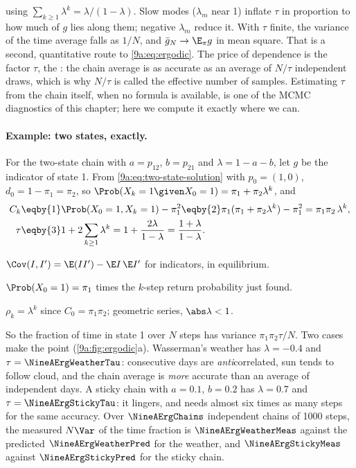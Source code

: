 using $\sum_{k\ge1}\lambda^k=\lambda/(1-\lambda)$. Slow modes ($\lambda_m$ near 1) inflate $\tau$
in proportion to how much of $g$ lies along them; negative $\lambda_m$ reduce it. With $\tau$
finite, the variance of the time average falls as $1/N$, and $\bar g_N\to\E_\pi g$ in mean square. That is a second,
quantitative route to \eqref{9a:eq:ergodic}. The price of dependence is the factor $\tau$, the
: the chain average is as accurate as an average of
$N/\tau$ independent draws, which is why $N/\tau$ is called the effective number of samples.
Estimating $\tau$ from the chain itself, when no formula is available, is one of the MCMC
diagnostics of this chapter; here we compute it exactly where we can.

\paragraph{Example: two states, exactly.}
For the two-state chain with $a=p_{12}$, $b=p_{21}$ and $\lambda=1-a-b$, let $g$ be the
indicator of state 1. From \eqref{9a:eq:two-state-solution} with $p_0=(1,0)$,
$d_0=1-\pi_1=\pi_2$, so $\Prob(X_k=1\given X_0=1)=\pi_1+\pi_2\lambda^k$, and
\begin{align}
  C_k
  &\eqby{1}\Prob(X_0=1,X_k=1)-\pi_1^2
   \eqby{2}\pi_1(\pi_1+\pi_2\lambda^k)-\pi_1^2
   =\pi_1\pi_2\,\lambda^k, \nonumber\\
  \tau
  &\eqby{3}1+2\sum_{k\ge1}\lambda^k
   =1+\frac{2\lambda}{1-\lambda}
   =\frac{1+\lambda}{1-\lambda} .
  \label{9a:eq:tau-two}
\end{align}
\begin{explain}
  \item $\Cov(I,I')=\E(II')-\E I\,\E I'$ for indicators, in equilibrium.
  \item $\Prob(X_0=1)=\pi_1$ times the $k$-step return probability just found.
  \item $\rho_k=\lambda^k$ since $C_0=\pi_1\pi_2$; geometric series, $\abs\lambda<1$.
\end{explain}
So the fraction of time in state 1 over $N$ steps has variance $\pi_1\pi_2\tau/N$. Two cases
make the point (\cref{9a:fig:ergodic}a). Wasserman's weather has $\lambda=-0.4$ and
$\tau=\NineAErgWeatherTau$: consecutive days are \emph{anti}correlated, sun tends to follow cloud,
and the chain average is \emph{more} accurate than an average of independent days. A sticky chain
with $a=0.1$, $b=0.2$ has $\lambda=0.7$ and $\tau=\NineAErgStickyTau$: it lingers, and needs almost
six times as many steps for the same accuracy. Over $\NineAErgChains$ independent chains of 1000
steps, the measured $N\Var$ of the time fraction is $\NineAErgWeatherMeas$ against the predicted
$\NineAErgWeatherPred$ for the weather, and $\NineAErgStickyMeas$ against $\NineAErgStickyPred$ for
the sticky chain.

